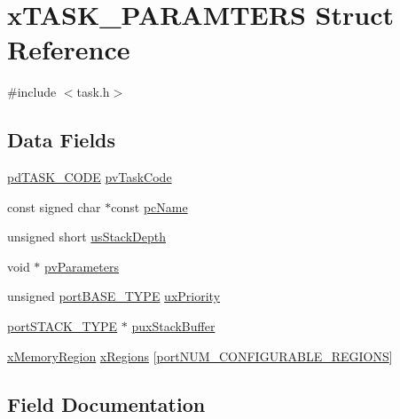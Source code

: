 \hypertarget{structx_t_a_s_k___p_a_r_a_m_t_e_r_s}{}\section{x\+T\+A\+S\+K\+\_\+\+P\+A\+R\+A\+M\+T\+E\+RS Struct Reference}
\label{structx_t_a_s_k___p_a_r_a_m_t_e_r_s}


{\ttfamily \#include $<$task.\+h$>$}

\subsection*{Data Fields}
\begin{DoxyCompactItemize}
\item 
\mbox{\hyperlink{projdefs_8h_a6eabc3f608295fa327ba34a7d909de10}{pd\+T\+A\+S\+K\+\_\+\+C\+O\+DE}} \mbox{\hyperlink{structx_t_a_s_k___p_a_r_a_m_t_e_r_s_a6cf96a364e0960bde2091fc333db4fe8}{pv\+Task\+Code}}
\item 
const signed char $\ast$const \mbox{\hyperlink{structx_t_a_s_k___p_a_r_a_m_t_e_r_s_a1abd63642561418cd7c05ae24750436b}{pc\+Name}}
\item 
unsigned short \mbox{\hyperlink{structx_t_a_s_k___p_a_r_a_m_t_e_r_s_a78a22fdc211362ec426d12678c6f538f}{us\+Stack\+Depth}}
\item 
void $\ast$ \mbox{\hyperlink{structx_t_a_s_k___p_a_r_a_m_t_e_r_s_a658917accb7ddae9d0befcc0904eb867}{pv\+Parameters}}
\item 
unsigned \mbox{\hyperlink{portmacro_8h_a1ebe82d24d764ae4e352f7c3a9f92c01}{port\+B\+A\+S\+E\+\_\+\+T\+Y\+PE}} \mbox{\hyperlink{structx_t_a_s_k___p_a_r_a_m_t_e_r_s_a986b666d0e341b98f5924c3531e43fc3}{ux\+Priority}}
\item 
\mbox{\hyperlink{portmacro_8h_ab0a294066ac7369b8f59a52d9491a92c}{port\+S\+T\+A\+C\+K\+\_\+\+T\+Y\+PE}} $\ast$ \mbox{\hyperlink{structx_t_a_s_k___p_a_r_a_m_t_e_r_s_aaadcae4a91cd0a46473d9c993091f5e1}{pux\+Stack\+Buffer}}
\item 
\mbox{\hyperlink{task_8h_a0327ca449bbeb07a6f76456943c787dc}{x\+Memory\+Region}} \mbox{\hyperlink{structx_t_a_s_k___p_a_r_a_m_t_e_r_s_a3369446f636e3d74d46d174590e244f0}{x\+Regions}} \mbox{[}\mbox{\hyperlink{portable_8h_aca7e1a8a568a38b74cc9db10c8efebda}{port\+N\+U\+M\+\_\+\+C\+O\+N\+F\+I\+G\+U\+R\+A\+B\+L\+E\+\_\+\+R\+E\+G\+I\+O\+NS}}\mbox{]}
\end{DoxyCompactItemize}


\subsection{Field Documentation}
\mbox{\label{structx_t_a_s_k___p_a_r_a_m_t_e_r_s_a1abd63642561418cd7c05ae24750436b}} 
